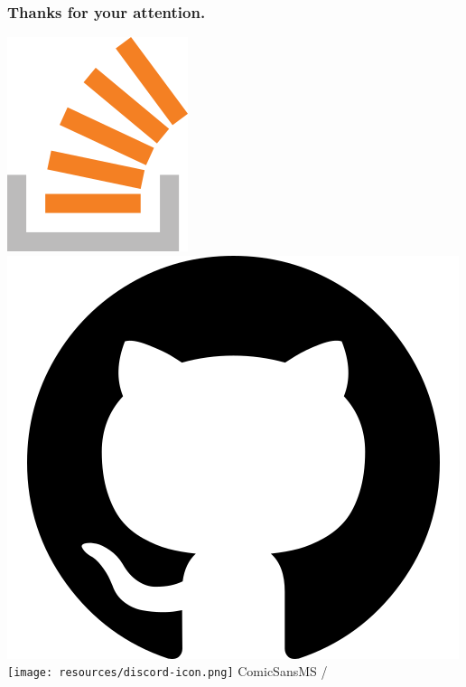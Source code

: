 \documentclass[aspectratio=169]{beamer}
\begin{document}
\begin{frame}
  \frametitle{Thanks for your attention.}

  \href{https://stackoverflow.com/users/577603/comicsansms}{\includegraphics[height=.05\textheight]{resources/so-icon.png}}
  \href{https://github.com/ComicSansMS}{\includegraphics[height=.05\textheight]{resources/github-icon.png}}
  \texttt{[image: resources/discord-icon.png]} ComicSansMS /

\end{frame}
\end{document}
